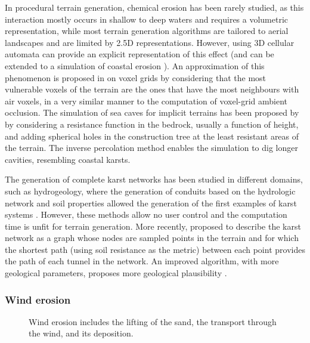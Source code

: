 In procedural terrain generation, chemical erosion has been rarely studied, as this interaction mostly occurs in shallow to deep waters and requires a volumetric representation, while most terrain generation algorithms are tailored to aerial landscapes and are limited by 2.5D representations. However, using 3D cellular automata can provide an explicit representation of this effect \cite{Menshutina2020} (and can be extended to a simulation of coastal erosion \cite{Hawick2014}). An approximation of this phenomenon is proposed in \cite{Beardall2007,Jones2010} on voxel grids by considering that the most vulnerable voxels of the terrain are the ones that have the most neighbours with air voxels, in a very similar manner to the computation of voxel-grid ambient occlusion. The simulation of sea caves for implicit terrains has been proposed by \cite{Paris2018} by considering a resistance function in the bedrock, usually a function of height, and adding spherical holes in the construction tree at the least resistant areas of the terrain. The inverse percolation method enables the simulation to dig longer cavities, resembling coastal karsts.

The generation of complete karst networks has been studied in different domains, such as hydrogeology, where the generation of conduits based on the hydrologic network and soil properties allowed the generation of the first examples of karst systems \cite{Jaquet2004,Pardo2012,Pytel2015}. However, these methods allow no user control and the computation time is unfit for terrain generation. More recently, \cite{Paris2021} proposed to describe the karst network as a graph whose nodes are sampled points in the terrain and for which the shortest path (using soil resistance as the metric) between each point provides the path of each tunnel in the network. An improved algorithm, with more geological parameters, proposes more geological plausibility \cite{Gouy2024}.


\subsubsection{Wind erosion}

\begin{figure}
    \centering
    \caption{Wind erosion includes the lifting of the sand, the transport through the wind, and its deposition.}
    \label{fig:erosion-wind-erosion}
\end{figure}

